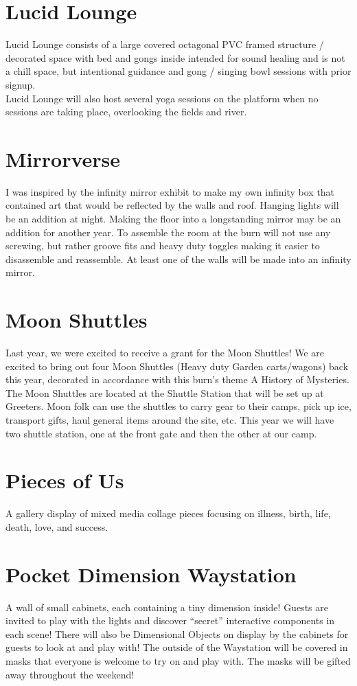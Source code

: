 \section*{Lucid Lounge}
Lucid Lounge consists of a large covered octagonal PVC framed structure / decorated space with bed and gongs inside intended for sound healing and is not a chill space, but intentional guidance and gong / singing bowl sessions with prior signup.\\
Lucid Lounge will also host several yoga sessions on the platform when no sessions are taking place, overlooking the fields and river.


\section*{Mirrorverse}
I was inspired by the infinity mirror exhibit to make my own infinity box that contained art that would be reflected by the walls and roof. Hanging lights will be an addition at night. Making the floor into a longstanding mirror may be an addition for another year. To assemble the room at the burn will not use any screwing, but rather groove fits and heavy duty toggles making it easier to disassemble and reassemble. At least one of the walls will be made into an infinity mirror.


\section*{Moon Shuttles}
Last year, we were excited to receive a grant for the Moon Shuttles! We are excited to bring out four Moon Shuttles (Heavy duty Garden carts/wagons) back this year, decorated in accordance with this burn's theme A History of Mysteries. The Moon Shuttles are located at the Shuttle Station that will be set up at Greeters. Moon folk can use the shuttles to carry gear to their camps, pick up ice, transport gifts, haul general items around the site, etc. This year we will have two shuttle station, one at the front gate and then the other at our camp.  


\section*{Pieces of Us}
A gallery display of mixed media collage pieces focusing on illness, birth, life, death, love, and success. 


\section*{Pocket Dimension Waystation}
A wall of small cabinets, each containing a tiny dimension inside! Guests are invited to play with the lights and discover ``secret'' interactive components in each scene! There will also be Dimensional Objects on display by the cabinets for guests to look at and play with! The outside of the Waystation will be covered in masks that everyone is welcome to try on and play with. The masks will be gifted away throughout the weekend!  



